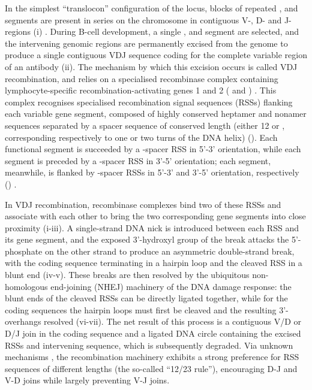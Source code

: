 In the simplest ``translocon'' configuration of the \igh{} locus, blocks of repeated \vh, \dh and \jh segments are present in series on the chromosome in contiguous V-, D- and J-regions (i) \parencite{schroeder2010immunoglobulins,jung2006vdjr}. During B-cell development, a single \vh, \dh and \jh segment are selected, and the intervening genomic regions are permanently excised from the genome to produce a single contiguous VDJ sequence coding for the complete variable region of an antibody (ii). The mechanism by which this excision occurs is called VDJ recombination, and relies on a specialised recombinase complex containing lymphocyte-specific recombination-activating genes 1 and 2 ( and ) \parencite{jung2006vdjr,schatz2011vdjr}. This complex recognises specialised recombination signal sequences (RSSs) flanking each variable gene segment, composed of highly conserved heptamer and nonamer sequences separated by a spacer sequence of conserved length (either 12 or , corresponding respectively to one or two turns of the DNA helix) \parencite{hesse1989rss} (). Each functional \vh segment is succeeded by a -spacer RSS in 5'-3' orientation, while each \jh segment is preceded by a -spacer RSS in 3'-5' orientation; each \dh segment, meanwhile, is flanked by -spacer RSSs in 5'-3' and 3'-5' orientation, respectively () \parencite{schatz2011vdjr}. 

In VDJ recombination, recombinase complexes bind two of these RSSs and associate with each other to bring the two corresponding gene segments into close proximity (i-iii). A single-strand DNA nick is introduced between each RSS and its gene segment, and the exposed 3'-hydroxyl group of the break attacks the 5'-phosphate on the other strand to produce an asymmetric double-strand break, with the coding sequence terminating in a hairpin loop and the cleaved RSS in a blunt end \parencite{schroeder2010immunoglobulins,schatz2011vdjr} (iv-v). These breaks are then resolved by the ubiquitous non-homologous end-joining (NHEJ) machinery of the DNA damage response: the blunt ends of the cleaved RSSs can be directly ligated together, while for the coding sequences the hairpin loops must first be cleaved and the resulting 3'-overhangs resolved \parencite{schroeder2010immunoglobulins,schatz2011vdjr} (vi-vii). The net result of this process is a contiguous V/D or D/J join in the coding sequence and a ligated DNA circle containing the excised RSSs and intervening sequence, which is subsequently degraded. Via unknown mechanisms \parencite{schatz2011vdjr}, the recombination machinery exhibits a strong preference for RSS sequences of different lengths (the so-called ``12/23 rule''), encouraging  D-J and V-D joins while largely preventing V-J joins. 


